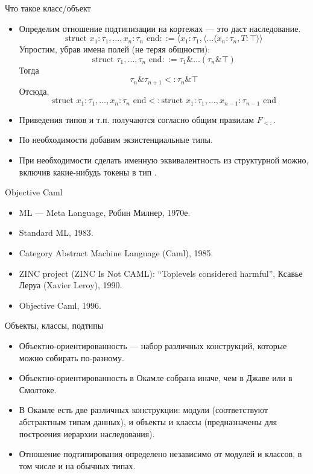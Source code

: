 \documentclass[aspectratio=169,dvipsnames,usenames]{beamer}
\begin{document}
\begin{frame}{Что такое класс/объект}
\begin{itemize}
\item Определим отношение подтипизации на кортежах --- это даст наследование.
$$\text{struct }x_1 : \tau_1,\dots,x_n : \tau_n\text{ end} ::= \langle x_1 : \tau_1, \langle\dots\langle x_n : \tau_n, T : \top\rangle\rangle$$
Упростим, убрав имена полей (не теряя общности):
$$\text{struct }\tau_1,\dots,\tau_n\text{ end} ::= \tau_1\&\dots(\tau_n\&\top)$$
Тогда $$\tau_n\&\tau_{n+1} <: \tau_n\&\top$$
Отсюда, $$\text{struct }x_1 : \tau_1,\dots,x_n : \tau_n\text{ end} <: \text{struct }x_1 : \tau_1,\dots,x_{n-1} : \tau_{n-1}\text{ end}$$
\item Приведения типов и т.п. получаются согласно общим правилам $F_{<:}$.
\item По необходимости добавим экзистенциальные типы.
\item При необходимости сделать именную эквивалентность из структурной можно, включив какие-нибудь токены в тип .
\end{itemize}
\end{frame}

\begin{frame}{Objective Caml}
\begin{itemize}
\item ML --- Meta Language, Робин Милнер, 1970е.
\item Standard ML, 1983.
\item Category Abstract Machine Language (Caml), 1985.
\item ZINC project (ZINC Is Not CAML): ``Toplevels considered harmful'', Ксавье Леруа (Xavier Leroy), 1990.
\item Objective Caml, 1996.
\end{itemize}
\end{frame}

\begin{frame}{Объекты, классы, подтипы}
\begin{itemize}
\item Объектно-ориентированность --- набор различных конструкций, которые можно собирать по-разному.
\item Объектно-ориентированность в Окамле собрана иначе, чем в Джаве или в Смолтоке.
\item В Окамле есть две различных конструкции: модули (соответствуют абстрактным типам данных), 
и объекты и классы (предназначены для построения иерархии наследования).
\item Отношение подтипирования определено независимо от модулей и классов, в том числе и на обычных типах.
\end{itemize}
\end{frame}
\end{document}
